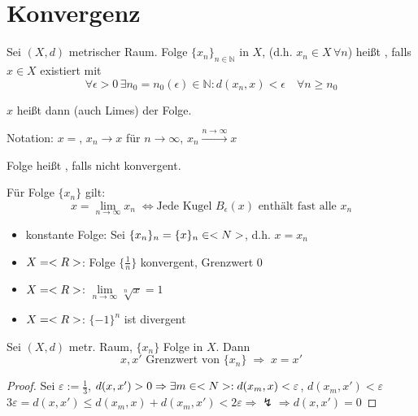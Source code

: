 \section{Konvergenz}\setcounter{theorem}{0}
\begin{*definition}[konvergent]
	Sei $(X,d)$ metrischer Raum. Folge $\{x_n\}_{n\in\mathbb{N}}$ in $X$, (d.h. $x_n\in X\,\forall n$) heißt , falls $x\in X$ existiert mit \[\forall \epsilon > 0 \,\exists n_0=n_0(\epsilon)\in\mathbb{N}: d(x_n, x) < \epsilon\quad \forall n\ge n_0\]
	
	$x$ heißt dann  (auch Limes) der Folge.
	
	Notation: $x=$, $x_n\rightarrow x$ für $n\rightarrow\infty$, $x_n \overset{n\rightarrow\infty}{\longrightarrow}x$
	
	Folge heißt , falls nicht konvergent.
\end{*definition}

\begin{conclusion}
	Für Folge $\{x_n\}$ gilt: \[ x=\lim\limits_{n\rightarrow\infty}x_n \;\Leftrightarrow \text{Jede Kugel $B_\epsilon(x)$ enthält fast alle $x_n$} \]
\end{conclusion}

\begin{example}
	\begin{itemize}
		\item konstante Folge: Sei $\{x_n\}_n=\{x\}_n\in<N>$, d.h. $x=x_n$
		\item $X=<R>$: Folge $\{\frac{1}{n}\}$ konvergent, Grenzwert 0
		\item $X=<R>$: $\lim\limits_{n\to\infty} \sqrt[n]{x}=1$
		\item $X=<R>$: $\{-1\}^n$ ist divergent
	\end{itemize}
\end{example}

\begin{proposition}
	Sei $(X,d)$ metr. Raum, $\{x_n\}$ Folge in $X$. Dann \[ x,x' \text{ Grenzwert von $\{x_n\}$} \;\Rightarrow\; x = x' \]
\end{proposition}
\begin{proof}
	Sei $\varepsilon:=\frac{1}{3}$, $d(x,x')>0\Rightarrow\exists m\in<N>:d(x_m,x)<\varepsilon$, $d(x_m,x')<\varepsilon$\\
	$3\varepsilon=d(x,x')\le d(x_m,x)+d(x_m,x')< 2\varepsilon\Rightarrow\lightning\Rightarrow d(x,x')=0$
\end{proof}


